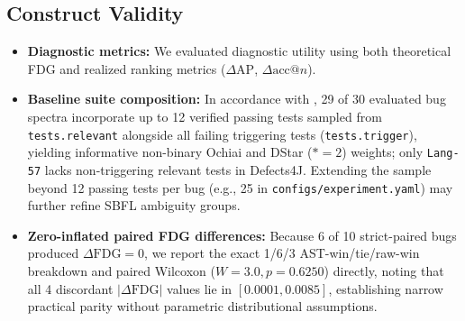 \documentclass[12pt, a4paper]{article}
\begin{document}
\subsection{Construct Validity}
\begin{itemize}[leftmargin=*]
  \item \textbf{Diagnostic metrics:} We evaluated diagnostic utility using both theoretical FDG and realized ranking metrics ($\Delta\text{AP}$, $\Delta\text{acc@}n$).
  \item \textbf{Baseline suite composition:} In accordance with \citet{an2022fdg}, 29 of 30 evaluated bug spectra incorporate up to 12 verified passing tests sampled from \texttt{tests.relevant} alongside all failing triggering tests (\texttt{tests.trigger}), yielding informative non-binary Ochiai and DStar ($*=2$) weights; only \texttt{Lang-57} lacks non-triggering relevant tests in Defects4J. Extending the sample beyond 12 passing tests per bug (e.g., 25 in \texttt{configs/experiment.yaml}) may further refine SBFL ambiguity groups.
  \item \textbf{Zero-inflated paired FDG differences:} Because 6 of 10 strict-paired bugs produced $\Delta\text{FDG} = 0$, we report the exact 1/6/3 AST-win/tie/raw-win breakdown and paired Wilcoxon ($W=3.0, p=0.6250$) directly, noting that all 4 discordant $|\Delta\text{FDG}|$ values lie in $[0.0001, 0.0085]$, establishing narrow practical parity without parametric distributional assumptions.
\end{itemize}
\end{document}
